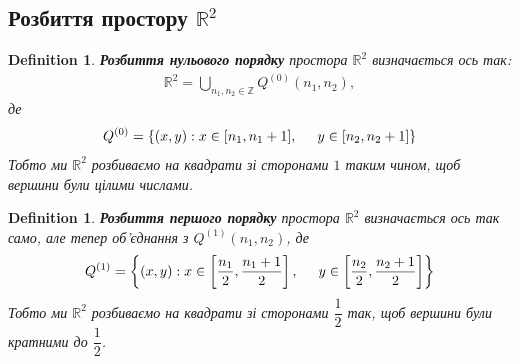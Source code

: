 \documentclass[a4paper, 10pt]{article}
\theoremstyle{theoremdd}
\theoremstyle{theoremdd}
\newtheorem{definition}[theorem]{Definition}
\theoremstyle{theoremdd}
\theoremstyle{theoremdd}
\theoremstyle{theoremdd}
\theoremstyle{theoremdd}
\theoremstyle{theoremdd}
\theoremstyle{theoremdd}
\begin{document}
\subsection{Розбиття простору $\mathbb{R}^2$}
\begin{definition}
\textbf{Розбиття нульового порядку} простора $\mathbb{R}^2$ визначається ось так:
\begin{align*}
\mathbb{R}^2 = \bigcup_{n_1,n_2 \in \mathbb{Z}} Q^{(0)}(n_1,n_2),
\end{align*}
де
\begin{align*}
Q^{(0)} = \{ (x,y): x \in [n_1,n_1+1], \hspace{0.5cm} y \in [n_2,n_2+1]\}
\end{align*}
Тобто ми $\mathbb{R}^2$ розбиваємо на квадрати зі сторонами $1$ таким чином, щоб вершини були цілими числами.
\end{definition}

\begin{figure}[H]
\centering
{}
\end{figure}

\begin{definition}
\textbf{Розбиття першого порядку} простора $\mathbb{R}^2$ визначається ось так само, але тепер об'єднання з $Q^{(1)}(n_1,n_2)$, де
\begin{align*}
Q^{(1)} = \left\{ (x,y): x \in \left[\dfrac{n_1}{2},\dfrac{n_1+1}{2} \right], \hspace{0.5cm} y \in \left[\dfrac{n_2}{2},\dfrac{n_2+1}{2} \right] \right\}
\end{align*}
Тобто ми $\mathbb{R}^2$ розбиваємо на квадрати зі сторонами $\dfrac{1}{2}$ так, щоб вершини були кратними до $\dfrac{1}{2}$.
\end{definition}

\begin{figure}[H]
\centering
{}
\end{figure}
\end{document}
